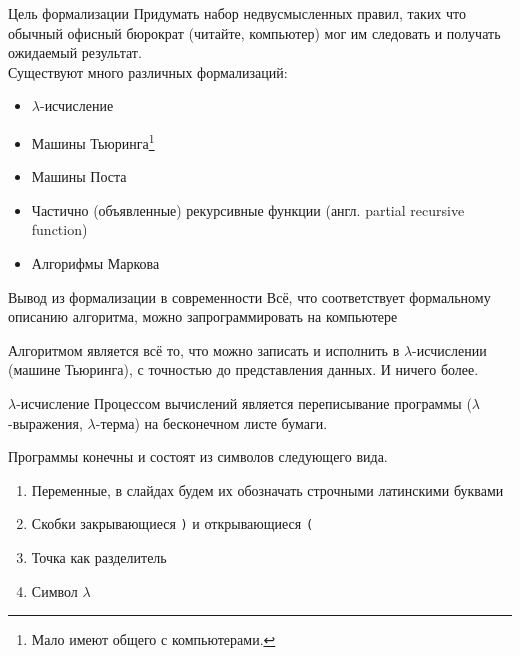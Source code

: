 \begin{frame}{Цель формализации}
Придумать набор недвусмысленных правил, таких что обычный офисный бюрократ (читайте, компьютер) мог им следовать и получать ожидаемый результат.\\

\vspace{1em}
Существуют много различных формализаций:
\begin{itemize}
\item $\lambda$-исчисление
\item Машины Тьюринга\footnote{Мало имеют общего с компьютерами. %
}
\item Машины Поста
\item Частично (объявленные) рекурсивные функции (англ. partial recursive function)
\item Алгорифмы Маркова
\end{itemize}
\end{frame}


\begin{frame}{Вывод из формализации в современности}
Всё, что соответствует формальному описанию алгоритма, можно запрограммировать на компьютере

\begin{definition}
Алгоритмом является всё то, что можно записать и исполнить в $\lambda$-исчислении (машине Тьюринга), с точностью до представления данных. И ничего более.
\end{definition}

\end{frame}


\begin{frame}{$\lambda$-исчисление}
Процессом вычислений является переписывание программы ($\lambda$-выражения, $\lambda$-терма) на бесконечном листе бумаги.

\vspace{1em}
Программы конечны и состоят из символов следующего вида.
\begin{enumerate}
\item Переменные, в слайдах будем их обозначать строчными латинскими буквами
\item Скобки закрывающиеся \texttt{)} и открывающиеся \texttt{(}
\item Точка как разделитель
\item Символ $\lambda$
\end{enumerate}
\end{frame}


